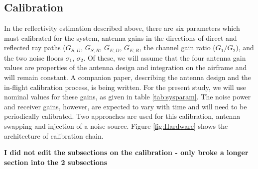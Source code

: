 \documentclass[draftcls,onecolumn]{IEEEtran}  %
\begin{document}
\subsection{Calibration}
\label{sec:calibration}
In the reflectivity estimation described above, there are six parameters which must calibrated for the system, antenna gains in the directions of direct and reflected ray paths ($G_{S,D}$, $G_{S,R}$, $G_{E,D}$, $G_{E,R}$, the channel gain ratio ($G_1/G_2$), and the two noise floors $\sigma_1$, $\sigma_2$. 
Of these, we will assume that the four antenna gain values are properties of the antenna design and integration on the airframe and will remain constant. 
A companion paper, describing the antenna design and the in-flight calibration process, is being written.  
For the present study, we will use nominal values for these gains, as given in table \ref{tab:sysparam}.
The noise power and receiver gains, however, are expected to vary with time and will need to be periodically calibrated. 
Two approaches are used for this calibration, antenna swapping and injection of a noise source. 
Figure \ref{fig:Hardware} shows the architecture of calibration chain.

\bf I did not edit the subsections on the calibration - only broke a longer section into the 2 subsections \rm
\end{document}
